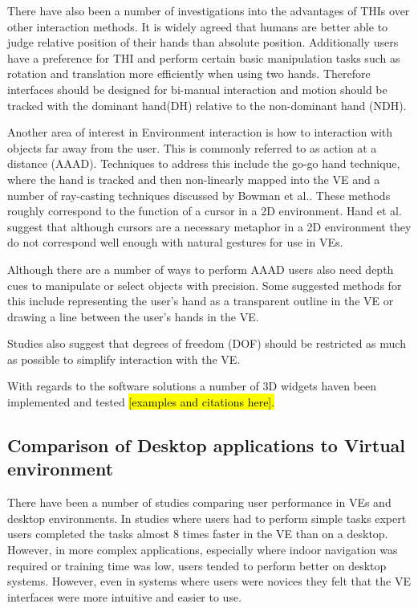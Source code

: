 \documentclass{sig-alternate-05-2015}
\begin{document}
 There have also been a number of investigations into the advantages of THIs over other interaction methods. It is widely agreed that humans are better able to judge relative position of their hands than absolute position.\cite{Bowman1998, Buxton1986} Additionally users have a preference for THI\cite{Buxton1986} and perform certain basic manipulation tasks such as rotation and translation more efficiently when using two hands.\cite{Schultheis2012,Balakrishnan1999} Therefore interfaces should be designed for bi-manual interaction and motion should be tracked with the dominant hand(DH) relative to the non-dominant hand (NDH).\cite{Hinckley1994}
 
 Another area of interest in Environment interaction is how to interaction with objects far away from the user. This is commonly referred to as action at a distance (AAAD). Techniques to address this include the go-go hand technique\cite{Poupyrev1996}, where the hand is tracked and then non-linearly mapped into the VE and a number of ray-casting techniques discussed by Bowman et al.\cite{Bowman2001}. These methods roughly correspond to the function of a cursor in a 2D environment. Hand et al. suggest that although cursors are a necessary metaphor in a 2D environment they do not correspond well enough with natural gestures for use in VEs.\cite{Hand1997}
 
 Although there are a number of ways to perform AAAD users also need depth cues to manipulate or select objects with precision.\cite{Schultheis2012} Some suggested methods for this include representing the user's hand as a transparent outline in the VE\cite{Hinckley1994} or drawing a line between the user's hands in the VE.\cite{Schultheis2012}
 
 
 Studies also suggest that degrees of freedom (DOF) should be restricted as much as possible to simplify interaction with the VE.\cite{Bowman2001}
 
 
  With regards to the software solutions a number of 3D widgets haven been implemented and tested \hl{[examples and citations here].}
 


\subsection{Comparison of Desktop applications to Virtual environment}
There have been a number of studies comparing user performance in VEs and desktop environments. In studies where users had to perform simple tasks expert users completed the tasks almost 8 times faster in the VE than on a desktop.\cite{Schultheis2012} However, in more complex applications, especially where indoor navigation was required or training time was low, users tended to perform better on desktop systems\cite{SousaSantos2009}. However, even in systems where users were novices they felt that the VE interfaces were more intuitive and easier to use\cite{Toma2012}.
\end{document}
